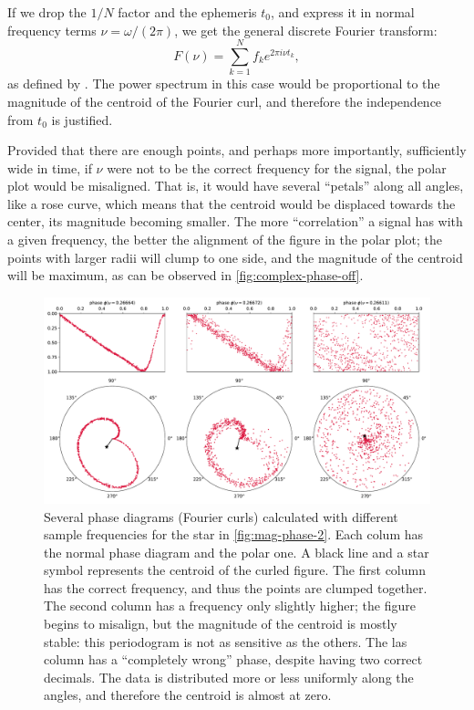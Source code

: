 	If we drop the $1/N$ factor and the ephemeris $t_0$, and express it in normal frequency terms $\nu=\omega/(2\pi)$, we get the general discrete Fourier transform:
	\begin{equation}
		F(\nu) = \sum_{k=1}^N f_k e^{2\pi i \nu t_k}, \label{eq:fourier}
	\end{equation} 
	as defined by \cite{Deeming1975,Thomson1971,Schuster1898}. 
	The power spectrum in this case would be proportional to the magnitude of the centroid of the Fourier curl, 
	and therefore the independence from $t_0$ is justified.
	
	Provided that there are enough points, and perhaps more importantly, sufficiently wide in time, 
	if $\nu$ were not to be the correct frequency for the signal, the polar plot would be misaligned.
	That is, it would have several \enquote{petals} along all angles, like a rose curve,
	which means that the centroid would be displaced towards the center, its magnitude becoming smaller.
	The more \enquote{correlation} a signal has with a given frequency, the better the alignment of the figure in the polar plot;
	the points with larger radii will clump to one side, and the magnitude of the centroid will be maximum, as can be observed in \autoref{fig:complex-phase-off}.
	
	\begin{figure}
		\centering
		\includegraphics[width=\textwidth]{img/complex_phase_off.pdf}
		\caption[Off-frequency phase diagrams: real and complex]{
			Several phase diagrams (Fourier curls) calculated with different sample frequencies for the star in \autoref{fig:mag-phase-2}.
			Each colum has the normal phase diagram and the polar one. A black line and a star symbol represents the centroid of the curled figure.
			The first column has the correct frequency, and thus the points are clumped together.
			The second column has a frequency only slightly higher; the figure begins to misalign, 
			but the magnitude of the centroid is mostly stable: this periodogram is not as sensitive as the others.
			The las column has a \enquote{completely wrong} phase, despite having two correct decimals.
			The data is distributed more or less uniformly along the angles, and therefore the centroid is almost at zero.
		}
		\label{fig:complex-phase-off}
	\end{figure}
	
